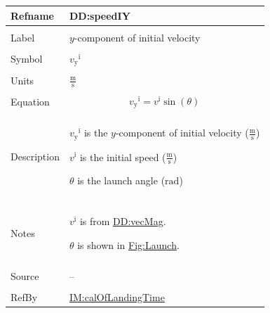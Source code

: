 \documentclass[12pt]{article}
\begin{document}
\vspace{\baselineskip}
\noindent
\begin{minipage}{\textwidth}
\begin{tabular}{>{\raggedright}p{}>{\raggedright\arraybackslash}p{}}
\toprule \textbf{Refname} & \textbf{DD:speedIY}
\label{DD:speedIY}
\\ \midrule \\
Label & $y$-component of initial velocity
        
\\ \midrule \\
Symbol & ${{v_{\text{y}}}^{\text{i}}}$
         
\\ \midrule \\
Units & $\frac{\text{m}}{\text{s}}$
        
\\ \midrule \\
Equation & \begin{displaymath}
           {{v_{\text{y}}}^{\text{i}}}={v^{\text{i}}} \sin\left(θ\right)
           \end{displaymath}
\\ \midrule \\
Description & \begin{symbDescription}
              \item{${{v_{\text{y}}}^{\text{i}}}$ is the $y$-component of initial velocity ($\frac{\text{m}}{\text{s}}$)}
              \item{${v^{\text{i}}}$ is the initial speed ($\frac{\text{m}}{\text{s}}$)}
              \item{$θ$ is the launch angle (${\text{rad}}$)}
              \end{symbDescription}
\\ \midrule \\
Notes & ${v^{\text{i}}}$ is from \hyperref[DD:vecMag]{DD:vecMag}.
        
        $θ$ is shown in \hyperref[Figure:Launch]{Fig:Launch}.
        
\\ \midrule \\
Source & --
         
\\ \midrule \\
RefBy & \hyperref[IM:calOfLandingTime]{IM:calOfLandingTime}
        
\\ \bottomrule
\end{tabular}
\end{minipage}
\end{document}
